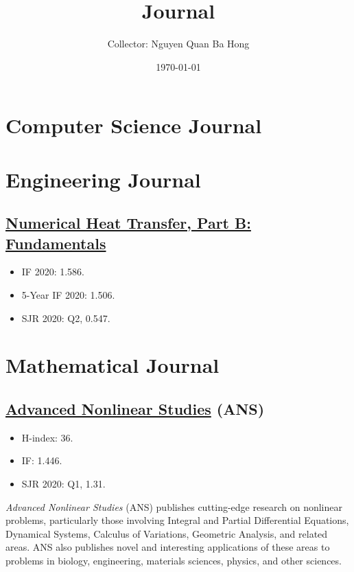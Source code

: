 \documentclass{article}
\title{Journal}
\author{Collector: Nguyen Quan Ba Hong}
\date{\today}
\numberwithin{equation}{section}
\begin{document}
\maketitle
\tableofcontents


\section{Computer Science Journal}

\section{Engineering Journal}

\subsection{\href{https://www.tandfonline.com/journals/unhb20}{Numerical Heat Transfer, Part B: Fundamentals}}
\begin{itemize}
	\item IF 2020: 1.586.
	\item 5-Year IF 2020: 1.506.
	\item SJR 2020: Q2, 0.547.
\end{itemize}

\section{Mathematical Journal}

\subsection{\href{https://www.degruyter.com/journal/key/ans/html}{Advanced Nonlinear Studies} (ANS)}
\begin{itemize}
	\item H-index: 36.
	\item IF: 1.446.
	\item SJR 2020: Q1, 1.31.
\end{itemize}
\textit{Advanced Nonlinear Studies} (ANS) publishes cutting-edge research on nonlinear problems, particularly those involving Integral and Partial Differential Equations, Dynamical Systems, Calculus of Variations, Geometric Analysis, and related areas. ANS also publishes novel and interesting applications of these areas to problems in biology, engineering, materials sciences, physics, and other sciences.
\end{document}
